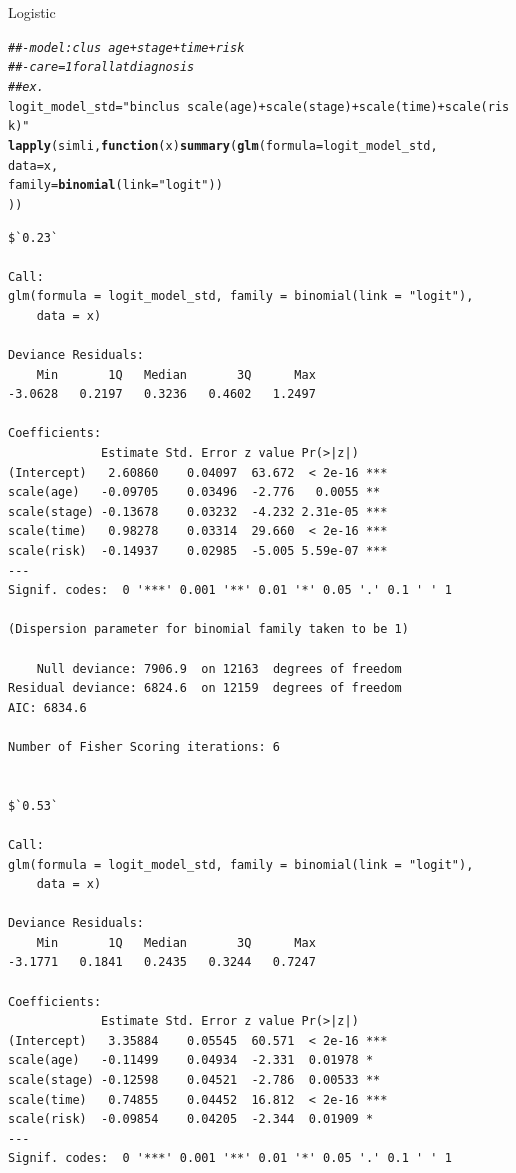 \documentclass[]{revtex4}\usepackage[]{graphicx}\usepackage[]{color}
\makeatletter
\newcommand{\hlstr}[1]{\textcolor[rgb]{0.192,0.494,0.8}{#1}}%
\newcommand{\hlcom}[1]{\textcolor[rgb]{0.678,0.584,0.686}{\textit{#1}}}%
\newcommand{\hlstd}[1]{\textcolor[rgb]{0.345,0.345,0.345}{#1}}%
\newcommand{\hlkwa}[1]{\textcolor[rgb]{0.161,0.373,0.58}{\textbf{#1}}}%
\newcommand{\hlkwb}[1]{\textcolor[rgb]{0.69,0.353,0.396}{#1}}%
\newcommand{\hlkwc}[1]{\textcolor[rgb]{0.333,0.667,0.333}{#1}}%
\newcommand{\hlkwd}[1]{\textcolor[rgb]{0.737,0.353,0.396}{\textbf{#1}}}%
\newenvironment{kframe}{%
 \def\at@end@of@kframe{}%
 \ifinner\ifhmode%
  \def\at@end@of@kframe{\end{minipage}}%
  \begin{minipage}{\columnwidth}%
 \fi\fi%
 \def\FrameCommand##1{\hskip\@totalleftmargin \hskip-\fboxsep
 \colorbox{shadecolor}{##1}\hskip-\fboxsep
     \hskip-\linewidth \hskip-\@totalleftmargin \hskip\columnwidth}%
 \MakeFramed {\advance\hsize-\width
   \@totalleftmargin\z@ \linewidth\hsize
   \@setminipage}}%
 {\par\unskip\endMakeFramed%
 \at@end@of@kframe}
\newenvironment{knitrout}{}{} %
\makeatother
\begin{document}
Logistic
\begin{knitrout}
\color{fgcolor}\begin{kframe}
\begin{alltt}
\hlcom{##- model: clus ~ age +  stage + time + risk}
\hlcom{##- care = 1 for all at diagnosis}
\hlcom{## ex. }
\hlstd{logit_model_std} \hlkwb{=} \hlstr{"binclus ~ scale(age) + scale(stage) + scale(time) + scale(risk)"}
\hlkwd{lapply}\hlstd{(simli ,} \hlkwa{function}\hlstd{(}\hlkwc{x}\hlstd{)} \hlkwd{summary}\hlstd{(}\hlkwd{glm}\hlstd{(}\hlkwc{formula} \hlstd{= logit_model_std,}
                                   \hlkwc{data} \hlstd{= x,}
                                   \hlkwc{family} \hlstd{=} \hlkwd{binomial}\hlstd{(}\hlkwc{link} \hlstd{=} \hlstr{"logit"}\hlstd{))}
\hlstd{))}
\end{alltt}
\begin{verbatim}
$`0.23`

Call:
glm(formula = logit_model_std, family = binomial(link = "logit"), 
    data = x)

Deviance Residuals: 
    Min       1Q   Median       3Q      Max  
-3.0628   0.2197   0.3236   0.4602   1.2497  

Coefficients:
             Estimate Std. Error z value Pr(>|z|)    
(Intercept)   2.60860    0.04097  63.672  < 2e-16 ***
scale(age)   -0.09705    0.03496  -2.776   0.0055 ** 
scale(stage) -0.13678    0.03232  -4.232 2.31e-05 ***
scale(time)   0.98278    0.03314  29.660  < 2e-16 ***
scale(risk)  -0.14937    0.02985  -5.005 5.59e-07 ***
---
Signif. codes:  0 '***' 0.001 '**' 0.01 '*' 0.05 '.' 0.1 ' ' 1

(Dispersion parameter for binomial family taken to be 1)

    Null deviance: 7906.9  on 12163  degrees of freedom
Residual deviance: 6824.6  on 12159  degrees of freedom
AIC: 6834.6

Number of Fisher Scoring iterations: 6


$`0.53`

Call:
glm(formula = logit_model_std, family = binomial(link = "logit"), 
    data = x)

Deviance Residuals: 
    Min       1Q   Median       3Q      Max  
-3.1771   0.1841   0.2435   0.3244   0.7247  

Coefficients:
             Estimate Std. Error z value Pr(>|z|)    
(Intercept)   3.35884    0.05545  60.571  < 2e-16 ***
scale(age)   -0.11499    0.04934  -2.331  0.01978 *  
scale(stage) -0.12598    0.04521  -2.786  0.00533 ** 
scale(time)   0.74855    0.04452  16.812  < 2e-16 ***
scale(risk)  -0.09854    0.04205  -2.344  0.01909 *  
---
Signif. codes:  0 '***' 0.001 '**' 0.01 '*' 0.05 '.' 0.1 ' ' 1


\end{verbatim}
\end{kframe}
\end{knitrout}
\end{document}
